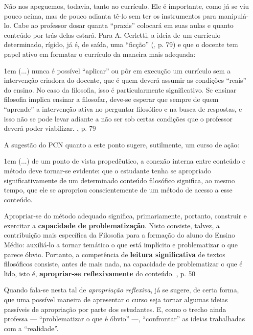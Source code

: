 \documentclass[12pt,a4paper]{article}
\newenvironment{citac}{\begin{addmargin}[4cm]{1em} \footnotesize}{\normalfont \end{addmargin}}
\begin{document}
	Não nos apeguemos, todavia, tanto ao currículo. Ele é importante, como 
	já se viu pouco acima, mas de pouco adianta tê-lo sem ter os 
	instrumentos para manipulá-lo. Cabe ao professor dosar quanta ``praxis'' 
	colocará em suas aulas e quanto conteúdo por trás delas estará. 	
	Para A. Cerletti, a ideia de um currículo determinado, rígido, já é, 
	de saída, uma ``ficção'' (\cite{cerletti}, p. 79) e que o docente tem 
	papel ativo em formatar o currículo da maneira mais adequada: 
	
	\begin{citac}
		(...) nunca é possível ``aplicar'' ou pôr em execução um currículo 
		sem a intervenção criadora do docente, que é quem deverá assumir as 
		condições ``reais'' do ensino. No caso da filosofia, isso é 
		particularmente significativo. Se ensinar filosofia implica ensinar 
		a filosofar, deve-se esperar que sempre de quem ``aprende'' a 
		intervenção ativa no perguntar filosófico e na busca de respostas, e 
		isso não se pode levar adiante a não ser sob certas condições que o 
		professor deverá poder viabilizar. \cite{cerletti}, p. 79
	\end{citac}
	
	A sugestão do PCN quanto a este ponto sugere, sutilmente, um curso de 
	ação: 
	
	\begin{citac}
	(...) de um ponto de vista propedêutico, a conexão interna entre conteúdo e método deve tornar-se evidente: que o estudante tenha se apropriado significativamente de um determinado conteúdo filosófico significa, ao mesmo tempo, que ele se apropriou conscientemente de um método de acesso a esse conteúdo.  
	
		Apropriar-se do método adequado significa, primariamente, portanto, construir e exercitar a \textbf{capacidade de problematização}. Nisto consiste, talvez, a contribuição mais específica da Filosofia para a formação do aluno do Ensino Médio: auxiliá-lo a tornar temático o que está implícito   e   problematizar   o   que   parece   óbvio.   Portanto,   a   competência   de   \textbf{leitura significativa}   de   textos   filosóficos   consiste,   antes   de   mais   nada,   na   capacidade   de   problematizar o que é lido, isto é, \textbf{apropriar-se reflexivamente} do conteúdo. 
		\cite{pcn}, p. 50
	\end{citac} 
	
	Quando fala-se nesta tal de \textit{apropriação reflexiva}, já se 
	sugere, de certa forma, que uma possível maneira de apresentar o curso 
	seja tornar algumas ideias passíveis de apropriação por parte dos 
	estudantes. E, como o trecho ainda professa --- ``problematizar o que é 
	óbvio'' ---, ``confrontar'' as ideias trabalhadas com a ``realidade''. 
	
\end{document}
